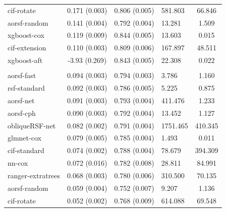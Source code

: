 \documentclass[twoside,11pt]{article}\usepackage[]{graphicx}\usepackage[]{xcolor}
\newenvironment{knitrout}{}{} %
\begin{document}
\begin{knitrout}
\begin{longtable}[t]{lcclc}
\hspace{1em}cif-rotate & 0.171 (0.003) & 0.806 (0.005) & 581.803 & 66.846\\
\hspace{1em}aorsf-random & 0.141 (0.004) & 0.792 (0.004) & 13.281 & 1.509\\
\hspace{1em}xgboost-cox & 0.119 (0.009) & 0.844 (0.005) & 13.603 & 0.015\\
\hspace{1em}cif-extension & 0.110 (0.003) & 0.809 (0.006) & 167.897 & 48.511\\
\hspace{1em}xgboost-aft & -3.93 (0.269) & 0.843 (0.005) & 22.308 & 0.022\\
\addlinespace[0.3em]
\hline
\multicolumn{5}{l}{\textit{\textbf{ARIC; stroke, n = 13623, p = 41}}}\\
\hline
\hspace{1em}aorsf-fast & 0.094 (0.003) & 0.794 (0.003) & 3.786 & 1.160\\
\hspace{1em}rsf-standard & 0.092 (0.003) & 0.786 (0.005) & 5.225 & 0.875\\
\hspace{1em}aorsf-net & 0.091 (0.003) & 0.793 (0.004) & 411.476 & 1.233\\
\hspace{1em}aorsf-cph & 0.090 (0.003) & 0.792 (0.004) & 13.452 & 1.127\\
\hspace{1em}obliqueRSF-net & 0.082 (0.002) & 0.791 (0.004) & 1751.465 & 410.345\\
\hspace{1em}glmnet-cox & 0.079 (0.005) & 0.785 (0.004) & 1.493 & 0.011\\
\hspace{1em}cif-standard & 0.074 (0.002) & 0.788 (0.004) & 78.679 & 394.309\\
\hspace{1em}nn-cox & 0.072 (0.016) & 0.782 (0.008) & 28.811 & 84.991\\
\hspace{1em}ranger-extratrees & 0.068 (0.003) & 0.780 (0.006) & 310.500 & 70.135\\
\hspace{1em}aorsf-random & 0.059 (0.004) & 0.752 (0.007) & 9.207 & 1.136\\
\hspace{1em}cif-rotate & 0.052 (0.002) & 0.768 (0.009) & 614.088 & 69.548\\

\end{longtable}
\end{knitrout}
\end{document}

